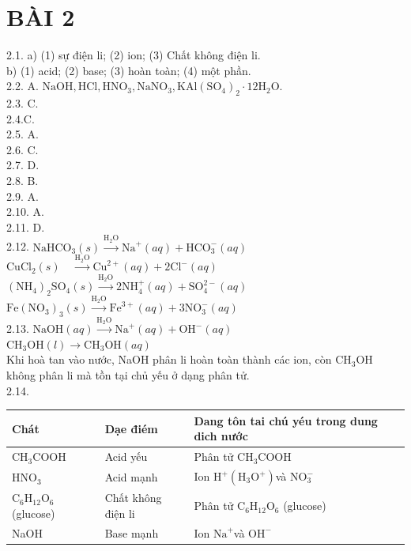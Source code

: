 \documentclass[10pt]{article}
\begin{document}
\section*{BÀI 2}
2.1. a) (1) sự điện li; (2) ion; (3) Chất không điện li.\\
b) (1) acid; (2) base; (3) hoàn toàn; (4) một phần.\\
2.2. A. $\mathrm{NaOH}, \mathrm{HCl}, \mathrm{HNO}_{3}, \mathrm{NaNO}_{3}, \mathrm{KAl}\left(\mathrm{SO}_{4}\right)_{2} \cdot 12 \mathrm{H}_{2} \mathrm{O}$.\\
2.3. C.\\
2.4.C.\\
2.5. A.\\
2.6. C.\\
2.7. D.\\
2.8. B.\\
2.9. A.\\
2.10. A.\\
2.11. D.\\
2.12. $\mathrm{NaHCO}_{3}(s) \xrightarrow{\mathrm{H}_{2} \mathrm{O}} \mathrm{Na}^{+}(a q)+\mathrm{HCO}_{3}^{-}(a q)$\\
$\mathrm{CuCl}_{2}(s) \quad \xrightarrow{\mathrm{H}_{2} \mathrm{O}} \mathrm{Cu}^{2+}(a q)+2 \mathrm{Cl}^{-}(a q)$\\
$\left(\mathrm{NH}_{4}\right)_{2} \mathrm{SO}_{4}(s) \xrightarrow{\mathrm{H}_{2} \mathrm{O}} 2 \mathrm{NH}_{4}^{+}(a q)+\mathrm{SO}_{4}^{2-}(a q)$\\
$\mathrm{Fe}\left(\mathrm{NO}_{3}\right)_{3}(s) \xrightarrow{\mathrm{H}_{2} \mathrm{O}} \mathrm{Fe}^{3+}(a q)+3 \mathrm{NO}_{3}^{-}(a q)$\\
2.13. $\mathrm{NaOH}(a q) \xrightarrow{\mathrm{H}_{2} \mathrm{O}} \mathrm{Na}^{+}(a q)+\mathrm{OH}^{-}(a q)$\\
$\mathrm{CH}_{3} \mathrm{OH}(l) \rightarrow \mathrm{CH}_{3} \mathrm{OH}(a q)$\\
Khi hoà tan vào nước, NaOH phân li hoàn toàn thành các ion, còn $\mathrm{CH}_{3} \mathrm{OH}$ không phân li mà tồn tại chủ yếu ở dạng phân tử.\\
2.14.

\begin{center}
\begin{tabular}{|l|l|l|}
\hline
Chát & Dạe điém & Dang tôn tai chú yéu trong dung dich nước \\
\hline
$\mathrm{CH}_{3} \mathrm{COOH}$ & Acid yếu & Phân tử $\mathrm{CH}_{3} \mathrm{COOH}$ \\
\hline
$\mathrm{HNO}_{3}$ & Acid mạnh & Ion $\mathrm{H}^{+}\left(\mathrm{H}_{3} \mathrm{O}^{+}\right)$và $\mathrm{NO}_{3}^{-}$ \\
\hline
$\mathrm{C}_{6} \mathrm{H}_{12} \mathrm{O}_{6}$ (glucose) & Chất không điện li & Phân tử $\mathrm{C}_{6} \mathrm{H}_{12} \mathrm{O}_{6}$ (glucose) \\
\hline
NaOH & Base mạnh & Ion $\mathrm{Na}^{+}$và $\mathrm{OH}^{-}$ \\
\hline
\end{tabular}
\end{center}
\end{document}
